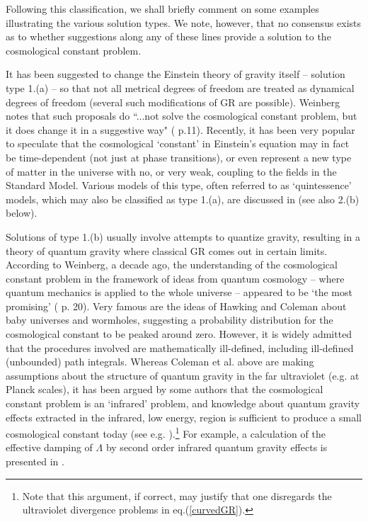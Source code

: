 \documentclass[12pt]{article}
\begin{document}
Following this classification, we shall briefly comment on
some examples illustrating the various solution types. 
 We note, however, that no consensus exists
as to whether suggestions along any of these lines provide a solution
to the cosmological constant problem. 

It has been suggested to change the Einstein theory of gravity
itself -- solution type 1.(a) -- so that not all metrical degrees of
freedom are treated as dynamical degrees of freedom (several such
modifications of GR are possible). Weinberg notes that such
proposals do ``...not solve the cosmological constant problem, but
it does change it in a suggestive way" (\cite{Weinberg89} p.11).
Recently, it has been very popular to speculate that the
cosmological `constant' in Einstein's equation may in fact be
time-dependent (not just at phase transitions), or even represent
a new type of matter in the universe with no, or very weak, coupling
to the fields in the Standard Model. Various models of this type, often 
referred to as `quintessence' models, which may also be classified as 
type 1.(a), are discussed in \cite{sahni99} (see also 2.(b) below).

Solutions of type 1.(b) usually involve attempts to quantize gravity,
resulting in a theory of quantum gravity where classical GR comes out
in certain limits.  According to Weinberg, a decade ago, the
understanding of the cosmological constant problem in the framework of
ideas from quantum cosmology -- where quantum mechanics is applied to
the whole universe -- appeared to be `the most promising'
(\cite{Weinberg89} p. 20). Very famous are the ideas of Hawking and
Coleman about baby universes and wormholes, suggesting a probability
distribution for the cosmological constant to be peaked around
zero. However, it is widely admitted that the procedures involved are
mathematically ill-defined, including ill-defined (unbounded) path
integrals.  Whereas Coleman et al. above are making assumptions about
the structure of quantum gravity in the far ultraviolet (e.g. at
Planck scales), it has been argued by some authors that the
cosmological constant problem is an `infrared' problem, and knowledge
about quantum gravity effects extracted in the infrared, low energy,
region is sufficient to produce a small cosmological constant today
(see e.g. \cite{tsamis93,mottolaXX}).\footnote{Note that this
argument, if correct, may justify that one disregards the ultraviolet
divergence problems in eq.(\ref{curvedGR}).} For example, a
calculation of the effective damping of $\Lambda$ by
second order infrared quantum gravity effects is presented in
\cite{tsamis93}.
\end{document}
